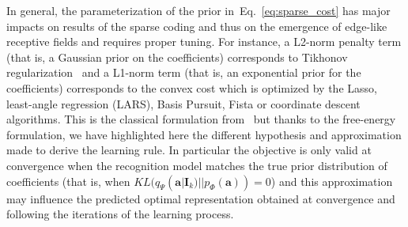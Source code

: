 \documentclass[draft]{article} %
\newcommand{\coef}{\mathbf{a}} %
\newcommand{\image}{\mathbf{I}} %
\newcommand{\dico}{\Phi} %
\newcommand{\seeEq}[1]{Eq.~\ref{eq:#1}}%
\begin{document}
In general, the parameterization of the prior in~\seeEq{sparse_cost} has major impacts on results of the sparse coding and thus on the emergence of edge-like receptive fields and requires proper tuning. For instance, a L2-norm penalty term (that is, a Gaussian prior on the coefficients) corresponds to Tikhonov regularization~\citep{Tikhonov77} and a L1-norm term (that is, an exponential prior for the coefficients) corresponds to the convex cost which is optimized by the Lasso, least-angle regression (LARS), Basis Pursuit, Fista or coordinate descent algorithms. %
This is the classical formulation from~\citet{Olshausen97} but thanks to the free-energy formulation,  we have highlighted here the different hypothesis and approximation made to derive the learning rule. In particular the objective is only valid at convergence when the recognition model matches the true prior distribution of coefficients (that is, when $KL( q_\Psi(\coef | \image_k) || p_\dico(\coef) )=0$) and this approximation may influence the predicted optimal representation obtained at convergence and following the iterations of the learning process.%
\end{document}

